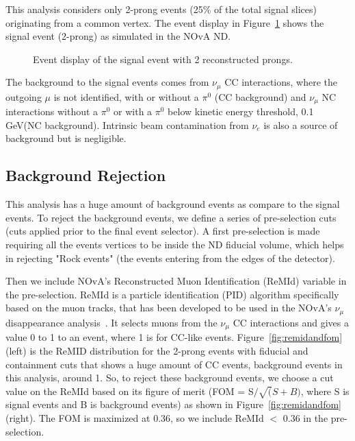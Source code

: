 \documentclass[12pt]{article}
\begin{document}
 This analysis considers only 2-prong events (25\% of the total signal slices) originating from a common vertex. The event display in Figure~\ref{fig:evd} shows the signal event (2-prong) as simulated in the NOvA ND.
 
 \begin{figure}[htb]
\begin{center}
\caption{Event display of the signal event with 2 reconstructed prongs.}
\label{fig:evd}
\end{center}
\end{figure}

The background to the signal events comes from $\nu_{\mu}$ CC interactions, where the outgoing $\mu$ is not identified, with or without a $\pi^{0}$ (CC background) and  $\nu_{\mu}$ NC interactions without a $\pi^{0}$ or with a $\pi^{0}$ below kinetic energy threshold, 0.1 GeV(NC background). Intrinsic beam contamination from $\nu_{e}$ is also a source of background but is negligible. 

\subsection{Background Rejection}

This analysis has a huge amount of background events as compare to the signal events. To reject the background events, we define a series of pre-selection cuts (cuts applied prior to the final event selector). A first pre-selection is made requiring all the events vertices to be inside the ND fiducial volume, which helps in rejecting "Rock events" (the events entering from the edges of the detector). 

Then we include NOvA's Reconstructed Muon Identification (ReMId) variable in the pre-selection. ReMId is a particle identification (PID) algorithm specifically based on the muon tracks, that has been developed to be used in the NOvA's  $\nu_{\mu}$ disappearance analysis~\cite{AdamsonI}. It selects muons from the $\nu_{\mu}$ CC interactions and gives a value 0 to 1 to an event, where 1 is for CC-like events. Figure~\ref{fig:remidandfom} (left) is the ReMID distribution for the 2-prong events with fiducial and containment cuts that shows a huge amount of CC events, background events in this analysis, around 1. So, to reject these background events, we choose a cut value on the ReMId based on its figure of merit (FOM = S$/\sqrt(S+B)$, where S is signal events and B is background events) as shown in Figure~\ref{fig:remidandfom} (right). The FOM is maximized at 0.36, so we include ReMId $<$ 0.36 in the pre-selection.
\end{document}
